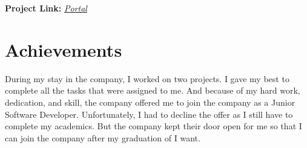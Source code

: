 \begin{flushleft}
\vspace{15pt}


\textbf{Project Link:} \href{https://portal.dreamonlinelimited.xyz/login}{\textit{Portal}}



\end{flushleft}


\section{Achievements}
\begin{flushleft}
    During my stay in the company, I worked on two projects. I gave my best to complete all the
tasks that were assigned to me. And because of my hard work, dedication, and skill, the
company offered me to join the company as a Junior Software Developer. Unfortunately, I had to
decline the offer as I still have to complete my academics. But the company kept their door open
for me so that I can join the company after my graduation of I want.

\end{flushleft}



